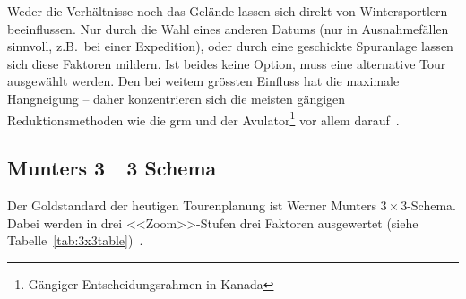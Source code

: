 Weder die Verhältnisse noch das Gelände lassen sich direkt von Wintersportlern beeinflussen. Nur durch die Wahl eines anderen Datums (nur in Ausnahmefällen sinnvoll, z.B.\ bei einer Expedition), oder durch eine geschickte Spuranlage lassen sich diese Faktoren mildern. 
Ist beides keine Option, muss eine alternative Tour ausgewählt werden.
Den bei weitem grössten Einfluss hat die maximale Hangneigung -- daher konzentrieren sich die meisten gängigen Reduktionsmethoden wie die \gls{grm} und der Avulator\footnote{Gängiger Entscheidungsrahmen in Kanada} vor allem darauf~\cite{arpddatasetdocs}\cite{harveyrhynerschweizerlawinenkunde}.

\subsection{Munters 3~\texttimes~3 Schema}
Der Goldstandard der heutigen Tourenplanung ist Werner Munters $3\times3$-Schema. Dabei werden in drei <<Zoom>>-Stufen drei Faktoren ausgewertet (siehe Tabelle~\ref{tab:3x3table})~\cite{munter}.


